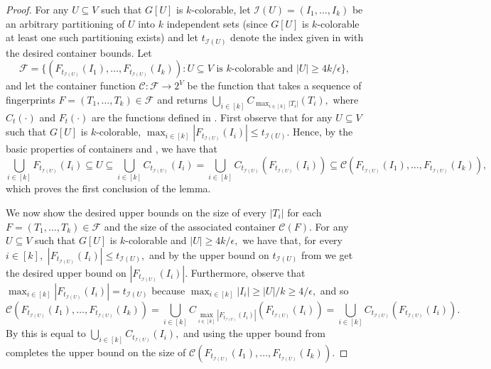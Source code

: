 \documentclass[11pt]{article}
\begin{document}
\GCLkcolNew*
\begin{proof}
    For any $U \subseteq V$ such that $G[U]$ is $k$-colorable, let $\mathcal{I}(U)=(I_1,\dots,I_k)$ be an arbitrary partitioning of $U$ into $k$ independent sets (since $G[U]$ is $k$-colorable at least one such partitioning exists) and let $t_{\mathcal{I}(U)}$ denote the index given in  with the desired container bounds.
    Let \[\mathcal{F}=\{(F_{t_{\mathcal{I}(U)}}(I_1),\dots,F_{t_{\mathcal{I}(U)}}(I_k)) : U\subseteq V \textrm{ is $k$-colorable and } |U| \geq 4k/\epsilon \},\] and let the container function $\mathcal{C}: \mathcal{F} \rightarrow 2^V$ be the function that takes a sequence of fingerprints $F = (T_1,\dots,T_k) \in \mathcal{F}$ and returns $\bigcup_{i \in [k]} C_{\max_{i \in [k]}|T_i|}(T_i),$ where $C_t(\cdot)$ and $F_t(\cdot)$ are the functions defined in .
    First observe that for any $U \subseteq V$ such that $G[U]$ is $k$-colorable, $\max_{i \in [k]} |F_{t_{\mathcal{I}(U)}}(I_i)| \leq t_{\mathcal{I}(U)}.$
    Hence, by the basic properties of containers and , we have that
    \[\bigcup_{i \in [k]} F_{t_{\mathcal{I}(U)}}(I_i) \subseteq U \subseteq \bigcup_{i \in [k]} C_{t_{\mathcal{I}(U)}}(I_i) = \bigcup_{i \in [k]} C_{t_{\mathcal{I}(U)}}(F_{t_{\mathcal{I}(U)}}(I_i)) \subseteq \mathcal{C}(F_{t_{\mathcal{I}(U)}}(I_1),\dots,F_{t_{\mathcal{I}(U)}}(I_k)),\]
    which proves the first conclusion of the lemma.

    We now show the desired upper bounds on the size of every $|T_i|$ for each $F=(T_1,\dots,T_k) \in \mathcal{F}$ and the size of the associated container $\mathcal{C}(F).$
    For any $U \subseteq V$ such that $G[U]$ is $k$-colorable and $|U| \geq 4k/\epsilon,$ we have that, for every $i \in [k],$ $|F_{t_{\mathcal{I}(U)}}(I_i)| \leq t_{\mathcal{I}(U)},$ and by the upper bound on $t_{\mathcal{I}(U)}$ from  we get the desired upper bound on $|F_{t_{\mathcal{I}(U)}}(I_i)|.$
    Furthermore, observe that $\max_{i \in [k]} |F_{t_{\mathcal{I}(U)}}(I_i)|=t_{\mathcal{I}(U)}$ because $\max_{i \in [k]} |I_i| \geq |U|/k \geq 4/\epsilon,$ and so
    \[
    \mathcal{C}(F_{t_{\mathcal{I}(U)}}(I_1),\dots,F_{t_{\mathcal{I}(U)}}(I_k)) = \bigcup_{i \in [k]} C_{\max_{i \in [k]}|F_{t_{\mathcal{I}(U)}}(I_i)|}(F_{t_{\mathcal{I}(U)}}(I_i)) = \bigcup_{i \in [k]} C_{t_{\mathcal{I}(U)}}(F_{t_{\mathcal{I}(U)}}(I_i)).
    \]
    By  this is equal to $\bigcup_{i \in [k]} C_{t_{\mathcal{I}(U)}}(I_i),$ and using the upper bound from  completes the upper bound on the size of $\mathcal{C}(F_{t_{\mathcal{I}(U)}}(I_1),\dots,F_{t_{\mathcal{I}(U)}}(I_k)).$
\end{proof}
\end{document}
